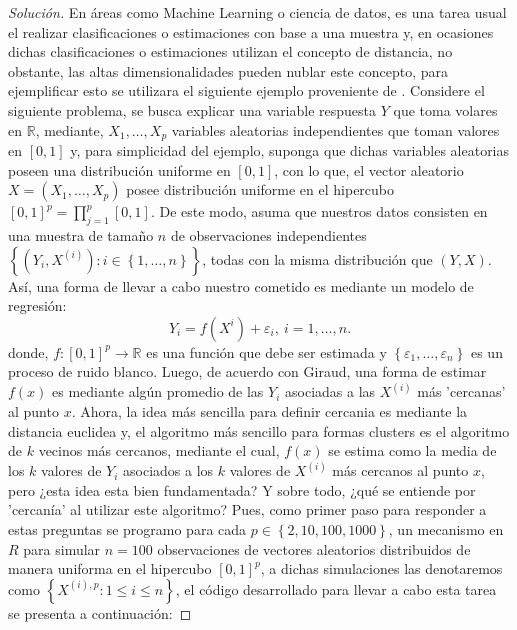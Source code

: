\documentclass[10.5pt,notitlepage]{article}
\newenvironment{solucion}
  {\begin{proof}[Solución]}
  {\end{proof}}
\newcommand{\RR}{\mathbb{R}}
\newcommand{\ee}{\varepsilon}
\newcommand{\kis}[1]{\left\{ #1 \right\}}
\theoremstyle{plain}
\begin{document}
\begin{exo}

\end{exo}
\begin{solucion}
En áreas como Machine Learning o ciencia de datos, es una tarea usual el realizar clasificaciones o estimaciones con base a una muestra y, en ocasiones dichas clasificaciones o estimaciones utilizan el concepto de distancia, no obstante, las altas dimensionalidades pueden nublar este concepto, para ejemplificar esto se utilizara el siguiente ejemplo proveniente de \textcite{giraud_introduction_2015}. Considere el siguiente problema, se busca explicar una variable respuesta \(Y\) que toma volares en \(\RR\), mediante, \(X_{1}, \hdots, X_{p}\) variables aleatorias independientes que toman valores en \([0,1]\) y, para simplicidad del ejemplo, suponga que dichas variables aleatorias poseen una distribución uniforme en \([0,1]\), con lo que, el vector aleatorio \(X =(X_1, \hdots, X_p)\) posee distribución uniforme en el hipercubo \([0,1]^{p}  = \prod_{j  = 1}^{p}[
0,1]\). De este modo, asuma que nuestros datos consisten en una muestra de tamaño \(n\) de observaciones independientes \(\kis{(Y_{i},X^{(i)}) : i \in \kis{1,\hdots,n}}\), todas con la misma distribución que \((Y, X)\). Así, una forma de llevar a cabo nuestro cometido es mediante un modelo de regresión:
\begin{equation*}
    Y_{i} = f(X^{i}) + \ee_{i}, \ i = 1, \hdots, n.
\end{equation*}
donde, \(f:[0,1]^p \to \RR\) es una función que debe ser estimada y \(\kis{\ee_1, \hdots, \ee_n}\) es un proceso de ruido blanco. Luego, de acuerdo con Giraud, una forma de estimar \(f(x)\) es mediante algún promedio de las \(Y_{i}\) asociadas a las \(X^{(i)}\) más 'cercanas' al punto \(x\). Ahora, la idea más sencilla para definir cercania es mediante la distancia euclidea y, el algoritmo más sencillo para formas clusters es el algoritmo de \(k\) vecinos más cercanos, mediante el cual, \(f(x)\) se estima como la media de los \(k\) valores de \(Y_{i}\) asociados a los \(k\) valores de \(X^{(i)}\) más cercanos al punto \(x\), pero ¿esta idea esta bien fundamentada? Y sobre todo, ¿qué se entiende por 'cercanía' al utilizar este algoritmo? Pues, como primer paso para responder a estas preguntas se programo para cada \(p\in \kis{2,10, 100,1000}\), un mecanismo en \(R\) para simular \(n = 100\) observaciones de vectores aleatorios distribuidos de manera uniforma en el hipercubo \([0,1]^p\), a dichas simulaciones las denotaremos como \(\kis{X^{(i),p}: 1 \leq i \leq n}\), el código desarrollado para llevar a cabo esta tarea se presenta a continuación: 

\end{solucion}
\end{document}
